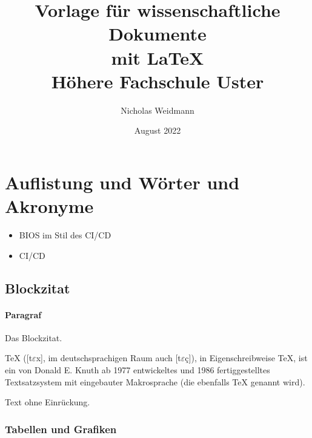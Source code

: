 \documentclass{article}
\title{Vorlage für wissenschaftliche Dokumente \protect\\ mit \LaTeX\\
\bigskip\large Höhere Fachschule Uster}
\author{Nicholas Weidmann}
\date{August 2022}
\begin{document}
\begin{titlepage}
  \maketitle
  \thispagestyle{empty}
\end{titlepage}

\tableofcontents
\clearpage

\section{Auflistung und Wörter und Akronyme}
\begin{itemize}
  \item \gls{BIOS} im Stil des \acrshort{CI/CD}
  \item \acrfull{CI/CD}
\end{itemize}

\subsection{Blockzitat}
\paragraph{Paragraf} Das Blockzitat.

\begin{displayquote}
  TeX ([t$\varepsilon$x], im deutschsprachigen Raum auch [t$\varepsilon$ç]), in Eigenschreibweise \TeX, ist ein von Donald E. Knuth ab 1977 entwickeltes und 1986 fertiggestelltes Textsatzsystem mit eingebauter Makrosprache (die ebenfalls TeX genannt wird).
  \cite{noauthor_tex_2022}
  \label{qte:tex}
\end{displayquote}

\noindent Text ohne Einrückung.

\subsubsection{Tabellen und Grafiken}
\end{document}
